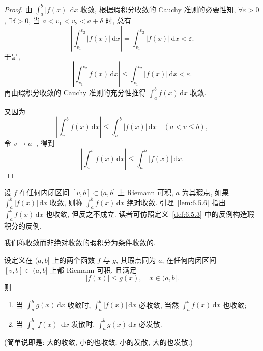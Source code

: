 \begin{proof}
由 $\int_{a}^{b}|f(x)|\,\mathrm{d}x$ 收敛, 根据瑕积分收敛的 Cauchy 准则的必要性知, $\forall\varepsilon>0$, $\exists\delta>0$, 当 $a<v_{1}<v_{2}<a+\delta$ 时, 总有
\[
\left|\int_{v_{1}}^{v_{2}}|f(x)|\,\mathrm{d}x\right|=\int_{v_{1}}^{v_{2}}|f(x)|\,\mathrm{d}x<\varepsilon.
\]
于是,
\[
\left|\int_{v_{1}}^{v_{2}}f(x)\,\mathrm{d}x\right|\leqslant\int_{v_{1}}^{v_{2}}|f(x)|\,\mathrm{d}x<\varepsilon.
\]
再由瑕积分收敛的 Cauchy 准则的充分性推得 $\int_{a}^{b}f(x)\,\mathrm{d}x$ 收敛.

又因为
\[
\left|\int_{v}^{b}f(x)\,\mathrm{d}x\right|\leqslant\int_{v}^{b}|f(x)|\,\mathrm{d}x\quad(a<v\leqslant b),
\]
令 $v\to a^{+}$, 得到
\[
\left|\int_{a}^{b}f(x)\,\mathrm{d}x\right|\leqslant\int_{a}^{b}|f(x)|\,\mathrm{d}x.
\]
\end{proof}

\begin{definition}\label{def:6.5.4}
设 $f$ 在任何内闭区间 $[v,b]\subset(a,b]$ 上 Riemann 可积, $a$ 为其瑕点, 如果 $\int_{a}^{b}|f(x)|\,\mathrm{d}x$ 收敛, 则称 $\int_{a}^{b}f(x)\,\mathrm{d}x$ 绝对收敛. 引理~\ref{lem:6.5.6} 指出 $\int_{a}^{b}f(x)\,\mathrm{d}x$ 也收敛, 但反之不成立. 读者可仿照定义~\ref{def:6.5.3} 中的反例构造瑕积分的反例.
\end{definition}

我们称收敛而非绝对收敛的瑕积分为条件收敛的.

\begin{theorem}[瑕积分的比较判别法]\label{thm:6.5.7}
设定义在 $(a,b]$ 上的两个函数 $f$ 与 $g$, 其瑕点同为 $a$, 在任何内闭区间 $[v,b]\subset(a,b]$ 上都 Riemann 可积, 且满足
\[
|f(x)|\leqslant g(x),\quad x\in(a,b].
\]
则
\begin{enumerate}[label=(\arabic*)]
\item 当 $\int_{a}^{b}g(x)\,\mathrm{d}x$ 收敛时, $\int_{a}^{b}|f(x)|\,\mathrm{d}x$ 必收敛, 当然 $\int_{a}^{b}f(x)\,\mathrm{d}x$ 也收敛;
\item 当 $\int_{a}^{b}|f(x)|\,\mathrm{d}x$ 发散时, $\int_{a}^{b}g(x)\,\mathrm{d}x$ 必发散.
\end{enumerate}
(简单说即是: 大的收敛, 小的也收敛; 小的发散, 大的也发散.)
\end{theorem}


